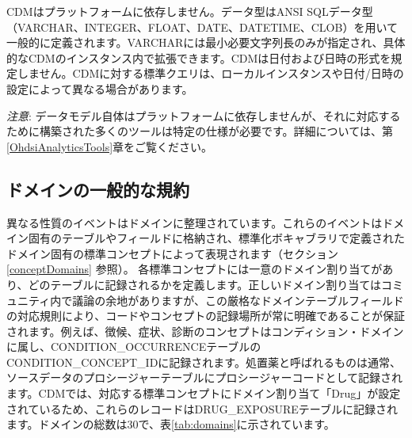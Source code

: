 \documentclass[
  11pt]{book}
\theoremstyle{definition}
\theoremstyle{definition}
\theoremstyle{definition}
\theoremstyle{definition}
\theoremstyle{remark}
\begin{document}
CDMはプラットフォームに依存しません。データ型はANSI SQLデータ型（VARCHAR、INTEGER、FLOAT、DATE、DATETIME、CLOB）を用いて一般的に定義されます。VARCHARには最小必要文字列長のみが指定され、具体的なCDMのインスタンス内で拡張できます。CDMは日付および日時の形式を規定しません。CDMに対する標準クエリは、ローカルインスタンスや日付/日時の設定によって異なる場合があります。

\emph{注意}: データモデル自体はプラットフォームに依存しませんが、それに対応するために構築された多くのツールは特定の仕様が必要です。詳細については、第 \ref{OhdsiAnalyticsTools}章をご覧ください。

\subsection{ドメインの一般的な規約}\label{domains}

異なる性質のイベントはドメインに整理されています。これらのイベントはドメイン固有のテーブルやフィールドに格納され、標準化ボキャブラリで定義されたドメイン固有の標準コンセプトによって表現されます（セクション \ref{conceptDomains} 参照）。 各標準コンセプトには一意のドメイン割り当てがあり、どのテーブルに記録されるかを定義します。正しいドメイン割り当てはコミュニティ内で議論の余地がありますが、この厳格なドメインテーブルフィールドの対応規則により、コードやコンセプトの記録場所が常に明確であることが保証されます。例えば、徴候、症状、診断のコンセプトはコンディション・ドメインに属し、CONDITION\_OCCURRENCEテーブルのCONDITION\_CONCEPT\_IDに記録されます。処置薬と呼ばれるものは通常、ソースデータのプロシージャーテーブルにプロシージャーコードとして記録されます。CDMでは、対応する標準コンセプトにドメイン割り当て「Drug」が設定されているため、これらのレコードはDRUG\_EXPOSUREテーブルに記録されます。ドメインの総数は30で、表\ref{tab:domains}に示されています。
\end{document}
